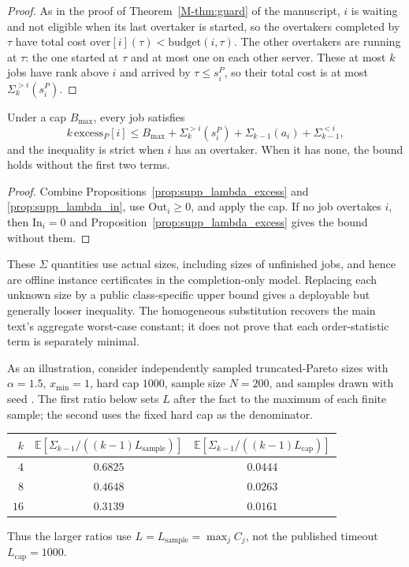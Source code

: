 \begin{proof}
As in the proof of Theorem~\ref*{M-thm:guard} of the manuscript, $i$ is waiting and not
eligible when its last overtaker is started, so the overtakers completed by $\tau$ have
total cost $\mathrm{over}[i](\tau)<\mathrm{budget}(i,\tau)$. The other overtakers are
running at $\tau$: the one started at $\tau$ and at most one on each other server. These
at most $k$ jobs have rank above $i$ and arrived by $\tau\leq s^P_i$, so their total cost
is at most $\Sigma^{>i}_k(s_i^P)$.
\end{proof}

\begin{proposition}
\label{prop:supp_lambda_guard}
Under a cap $B_{\max}$, every job satisfies
\[
 k\,\mathrm{excess}_P[i]
 \leq B_{\max}+\Sigma^{>i}_k(s_i^P)
 +\Sigma_{k-1}(a_i)+\Sigma^{<i}_{k-1},
\]
and the inequality is strict when $i$ has an overtaker. When it has none, the bound
holds without the first two terms.
\end{proposition}

\begin{proof}
Combine Propositions~\ref{prop:supp_lambda_excess} and
\ref{prop:supp_lambda_in}, use $\mathrm{Out}_i\geq0$, and apply the cap. If no
job overtakes $i$, then $\mathrm{In}_i=0$ and
Proposition~\ref{prop:supp_lambda_excess} gives the bound without them.
\end{proof}

These $\Sigma$ quantities use actual sizes, including sizes of unfinished
jobs, and hence are offline instance certificates in the completion-only model.
Replacing each unknown size by a public class-specific upper bound gives a
deployable but generally looser inequality. The homogeneous substitution recovers
the main text's aggregate worst-case constant; it does not prove that each
order-statistic term is separately minimal.

As an illustration, consider independently sampled truncated-Pareto sizes with
$\alpha=1.5$, $x_{\min}=1$, hard cap $1000$, sample size $N=200$, and
 samples drawn with seed . The first ratio below
sets $L$ after the fact to the maximum of each finite sample; the second uses the
fixed hard cap as the denominator.
\begin{center}
\begin{tabular}{rcc}
\hline
$k$ & $\mathbb{E}[\Sigma_{k-1}/((k-1)L_{\mathrm{sample}})]$
    & $\mathbb{E}[\Sigma_{k-1}/((k-1)L_{\mathrm{cap}})]$ \\
\hline
$4$  & $0.6825$ & $0.0444$ \\
$8$  & $0.4648$ & $0.0263$ \\
$16$ & $0.3139$ & $0.0161$ \\
\hline
\end{tabular}
\end{center}
Thus the larger ratios use $L=L_{\mathrm{sample}}=\max_j C_j$, not the published
timeout $L_{\mathrm{cap}}=1000$.


